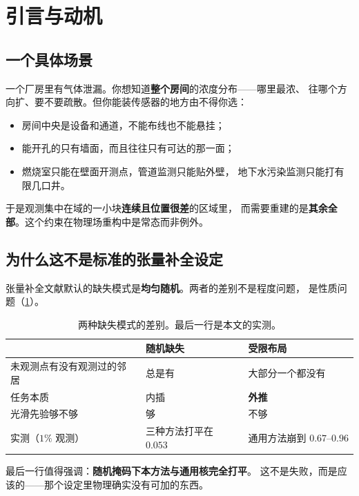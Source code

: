 \documentclass[11pt,a4paper]{article}
\begin{document}
\section{引言与动机}

\subsection{一个具体场景}

一个厂房里有气体泄漏。你想知道\textbf{整个房间}的浓度分布——哪里最浓、
往哪个方向扩、要不要疏散。但你能装传感器的地方由不得你选：

\begin{itemize}[nosep,leftmargin=1.6em]
  \item 房间中央是设备和通道，不能布线也不能悬挂；
  \item 能开孔的只有墙面，而且往往只有可达的那一面；
  \item 燃烧室只能在壁面开测点，管道监测只能贴外壁，
        地下水污染监测只能打有限几口井。
\end{itemize}

于是观测集中在域的一小块\textbf{连续且位置很差}的区域里，
而需要重建的是\textbf{其余全部}。这个约束在物理场重构中是常态而非例外。

\subsection{为什么这不是标准的张量补全设定}

张量补全文献默认的缺失模式是\textbf{均匀随机}。两者的差别不是程度问题，
是性质问题（\cref{tab:setting}）。

\begin{table}[t]
\centering
\caption{两种缺失模式的差别。最后一行是本文的实测。}
\label{tab:setting}
\begin{tabular}{lll}
\toprule
 & 随机缺失 & 受限布局 \\
\midrule
未观测点有没有观测过的邻居 & 总是有 & 大部分一个都没有 \\
任务本质 & 内插 & \textbf{外推} \\
光滑先验够不够 & 够 & 不够 \\
实测（$1\%$ 观测） & 三种方法打平在 $0.053$ & 通用方法崩到 $0.67$--$0.96$ \\
\bottomrule
\end{tabular}
\end{table}

最后一行值得强调：\textbf{随机掩码下本方法与通用核完全打平}。
这不是失败，而是应该的——那个设定里物理确实没有可加的东西。
\end{document}
